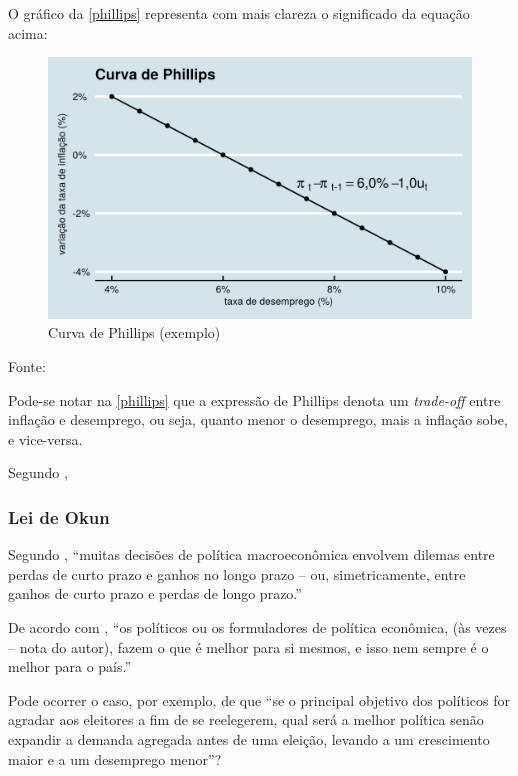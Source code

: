 \documentclass[]{article}
\begin{document}
O gráfico da \autoref{phillips} representa com mais clareza o
significado da equação acima:

\begin{figure}
\centering
\includegraphics{imagens/phillips.png}
\caption{Curva de Phillips (exemplo)}\label{phillips}
\end{figure}

Fonte: \cite{blanchard}

Pode-se notar na \autoref{phillips} que a expressão de Phillips denota
um \emph{trade-off} entre inflação e desemprego, ou seja, quanto menor o
desemprego, mais a inflação sobe, e vice-versa.

Segundo ,

\subsubsection{Lei de Okun}\label{lei-de-okun}

Segundo , ``muitas decisões de política
macroeconômica envolvem dilemas entre perdas de curto prazo e ganhos no
longo prazo -- ou, simetricamente, entre ganhos de curto prazo e perdas
de longo prazo.''

De acordo com , ``os políticos ou os
formuladores de política econômica, (às vezes -- nota do autor), fazem o
que é melhor para si mesmos, e isso nem sempre é o melhor para o país.''

Pode ocorrer o caso, por exemplo, de que ``se o principal objetivo dos
políticos for agradar aos eleitores a fim de se reelegerem, qual será a
melhor política senão expandir a demanda agregada antes de uma eleição,
levando a um crescimento maior e a um desemprego menor''?
\end{document}
